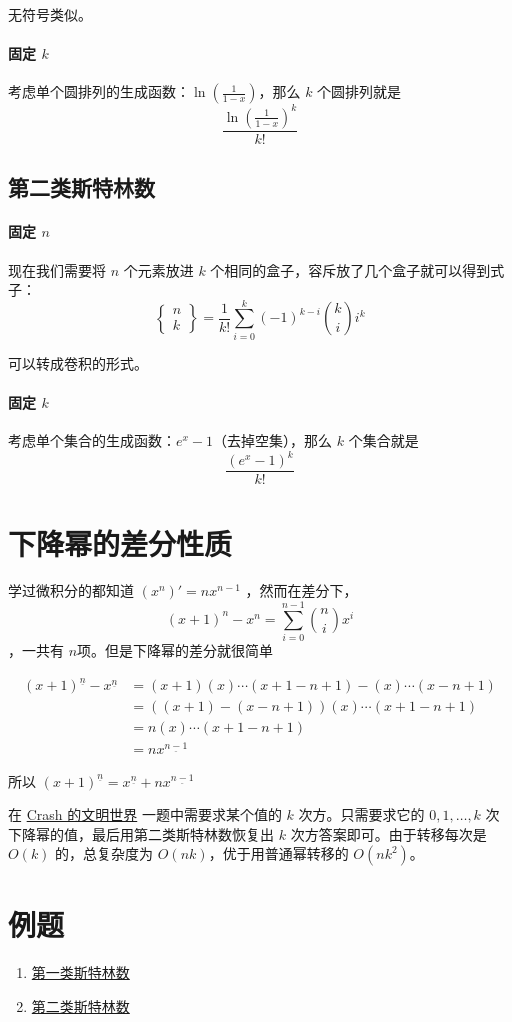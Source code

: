 \documentclass{article}
\begin{document}
无符号类似。
\paragraph{固定 $k$}
考虑单个圆排列的生成函数：$\ln(\frac{1}{1-x})$，那么 $k$ 个圆排列就是
$$
\frac{\ln(\frac{1}{1-x})^k}{k!}
$$
\subsection{第二类斯特林数}

\paragraph{固定 $n$}
现在我们需要将 $n$ 个元素放进 $k$ 个相同的盒子，容斥放了几个盒子就可以得到式子：
$$
\begin{Bmatrix}n\\k\end{Bmatrix} = \frac{1}{k!}\sum_{i=0}^k (-1)^{k-i}\binom{k}{i} i^{k}
$$

可以转成卷积的形式。


\paragraph{固定 $k$}
考虑单个集合的生成函数：$e^x-1$（去掉空集），那么 $k$ 个集合就是
$$
\frac{(e^x-1)^k}{k!}
$$

\section{下降幂的差分性质}

学过微积分的都知道 $(x^n)' = nx^{n-1}$ ，然而在差分下，
$$
(x+1)^n - x^n = \sum_{i=0}^{n-1} \binom{n}{i}x^i
$$，一共有 $n$项。但是下降幂的差分就很简单

\begin{align*}
    (x+1)^{\underline{n}} - x^{\underline{n}} 
&= (x+1)(x)\cdots (x+1-n+1) - (x)\cdots (x-n+1)\\
&= ((x+1)-(x-n+1))(x)\cdots (x+1-n+1)\\
&= n(x)\cdots (x+1-n+1)\\
&= nx^{\underline{n-1}}
\end{align*}

所以 $(x+1)^{\underline{n}} = x^{\underline{n}} + nx^{\underline{n-1}}$

在 \href{https://darkbzoj.tk/problem/2159}{Crash 的文明世界} 一题中需要求某个值的 $k$ 次方。只需要求它的 $0,1,\ldots,k$ 次下降幂的值，最后用第二类斯特林数恢复出 $k$ 次方答案即可。由于转移每次是 $O(k)$ 的，总复杂度为 $O(nk)$，优于用普通幂转移的 $O(nk^2)$。



\section{例题}
\begin{enumerate}
    \item \href{https://judge.yosupo.jp/problem/stirling_number_of_the_first_kind}{第一类斯特林数}
    \item \href{https://judge.yosupo.jp/problem/stirling_number_of_the_second_kind}{第二类斯特林数}
\end{enumerate}
\end{document}
